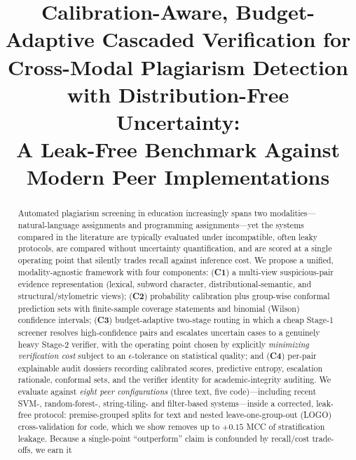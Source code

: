\documentclass[conference]{IEEEtran}
\begin{document}
\title{Calibration-Aware, Budget-Adaptive Cascaded Verification for\\
Cross-Modal Plagiarism Detection with Distribution-Free Uncertainty:\\
A Leak-Free Benchmark Against Modern Peer Implementations}

\author{
}

\maketitle

\begin{abstract}
Automated plagiarism screening in education increasingly spans two modalities---natural-language
assignments and programming assignments---yet the systems compared in the literature are typically
evaluated under incompatible, often leaky protocols, are compared without uncertainty quantification,
and are scored at a single operating point that silently trades recall against inference cost.
We propose a unified, modality-agnostic framework with four components:
(\textbf{C1}) a multi-view suspicious-pair evidence representation (lexical, subword character,
distributional-semantic, and structural/stylometric views);
(\textbf{C2}) probability calibration plus group-wise conformal prediction sets with finite-sample
coverage statements and binomial (Wilson) confidence intervals;
(\textbf{C3}) budget-adaptive two-stage routing in which a cheap Stage-1 screener resolves
high-confidence pairs and escalates uncertain cases to a genuinely heavy Stage-2 verifier,
with the operating point chosen by explicitly \emph{minimizing verification cost} subject to an
$\epsilon$-tolerance on statistical quality; and
(\textbf{C4}) per-pair explainable audit dossiers recording calibrated scores, predictive entropy,
escalation rationale, conformal sets, and the verifier identity for academic-integrity auditing.
We evaluate against \emph{eight peer configurations} (three text, five code)---including recent
SVM-, random-forest-, string-tiling- and filter-based systems---inside a corrected,
leak-free protocol: premise-grouped splits for text and nested leave-one-group-out (LOGO)
cross-validation for code, which we show removes up to $+0.15$ MCC of stratification leakage.
Because a single-point ``outperform'' claim is confounded by recall/cost trade-offs, we earn it

\end{abstract}
\end{document}
